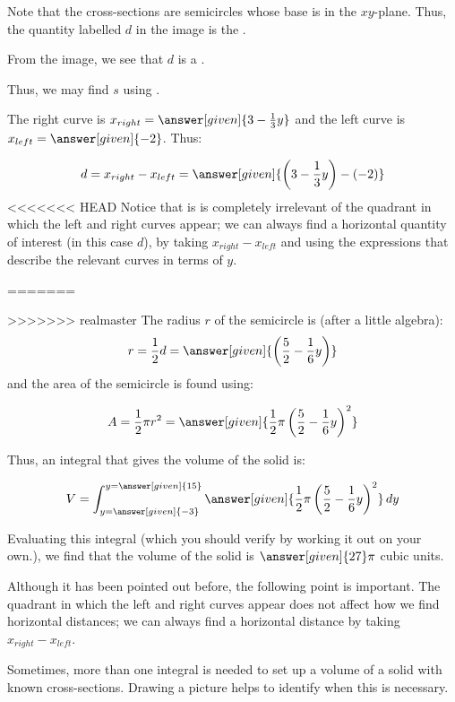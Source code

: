 \documentclass{ximera}
\begin{document}
\begin{example}
\begin{explanation}
Note that the cross-sections are semicircles whose base is in the $xy$-plane.  Thus, the quantity labelled $d$ in the image is the .

From the image, we see that $d$ is a .

Thus, we may find $s$ using .

The right curve is $x_{right} = \answer[given]{3-\frac{1}{3}y}$ and the left curve is $x_{left} = \answer[given]{-2}$.  Thus:

\[
d=x_{right}-x_{left} = \answer[given]{\left(3-\frac{1}{3} y \right)-(-2)}
\]
<<<<<<< HEAD
Notice that is is completely irrelevant of the quadrant in which the left and right curves appear; we can always find a horizontal quantity of interest (in this case $d$), by taking $x_{right}-x_{left}$ and using the expressions that describe the relevant curves in terms of $y$.
 
=======

>>>>>>> realmaster
The radius $r$ of the semicircle is (after a little algebra):
\[
r = \frac{1}{2}d = \answer[given]{ \left(\frac{5}{2}-\frac{1}{6} y\right)}
\]
and the area of the semicircle is found using:

\[
A = \frac{1}{2} \pi r^2 = \answer[given]{\frac{1}{2} \pi\left(\frac{5}{2} - \frac{1}{6}y\right)^2}
\]

Thus, an integral that gives the volume of the solid is:

\[
V = \int_{y=\answer[given]{-3}}^{y=\answer[given]{15}} \answer[given]{\frac{1}{2} \pi\left(\frac{5}{2} - \frac{1}{6}y\right)^2} \d y
\]

Evaluating this integral (which you should verify by working it out on your own.), we find that the volume of the solid is $\answer[given]{27} \pi$ cubic units.
\end{explanation}

\begin{remark}
Although it has been pointed out before, the following point is important.  The quadrant in which the left and right curves appear does not affect how we find horizontal distances; we can always find a horizontal distance by taking $x_{right}-x_{left}$.  
\end{remark}
\end{example}

Sometimes, more than one integral is needed to set up a volume of a solid with known cross-sections.  Drawing a picture helps to identify when this is necessary.
\end{document}
